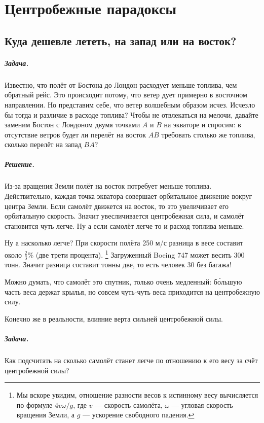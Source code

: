 \chapter{Центробежные парадоксы}

\section{Куда дешевле лететь, на запад или на восток?}

\paragraph{Задача.}
Известно, что полёт от Бостона до Лондон расходует меньше топлива, чем обратный рейс.
Это происходит потому, что ветер дует примерно в восточном направлении.
Но представим себе, что ветер волшебным образом исчез.
Исчезло бы тогда и различие в расходе топлива?
Чтобы не отвлекаться на мелочи, давайте заменим Бостон с Лондоном двумя точками $A$ и $B$ на экваторе и спросим: в отсутствие ветров будет ли перелёт на восток $AB$ требовать столько же топлива, сколько перелёт на запад $BA$?

\paragraph{Решение.}
Из-за вращения Земли полёт на восток потребует меньше топлива.
Действительно, каждая точка экватора совершает орбитальное движение вокруг центра Земли.
Если самолёт движется на восток, то это увеличивает его орбитальную скорость.
Значит увесличивается центробежная сила, и самолёт становится чуть легче.
Ну а если самолёт легче то и расход топлива меньше.

Ну а насколько легче?
При скорости полёта 250 м/с разница в весе составит около $
\tfrac23 \%$ (две трети процента).%
\footnote{Мы вскоре увидим,
отношение разности весов к истинному весу вычисляется по формуле
$4v\omega/g$,
где $v$ --- скорость самолёта,
$\omega$ --- угловая скорость вращения Земли,
а $g$ --- ускорение свободного падения.}
Загруженный Boeing 747 может весить 300 тонн.
Значит разница составит тонны две, то есть человек 30 без багажа!

Можно думать, что самолёт это спутник, только очень медленный:
б\'{о}льшую часть веса держат крылья, но совсем чуть-чуть веса приходится на центробежную силу.

Конечно же в реальности, влияние верта сильней центробежной силы.

\paragraph{Задача.}
Как подсчитать на сколько самолёт станет легче по отношению к его весу за счёт центробежной силы?

